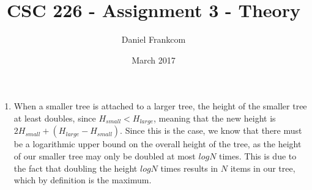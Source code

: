 \documentclass{article}
\title{CSC 226 - Assignment 3 - Theory}
\date{March 2017}
\author{Daniel Frankcom}
\begin{document}
	\maketitle
	\setlength{\parindent}{0pt}
	\newcommand{\forceindent}{\leavevmode{\parindent=72pt\indent}}
	\newpage
	
	\begin{enumerate}
		\item When a smaller tree is attached to a larger tree, the height of the smaller tree at least doubles, since $H_{small}<H_{large}$, meaning that the new height is $2H_{small}+(H_{large}-H_{small})$.
		\newline Since this is the case, we know that there must be a logarithmic upper bound on the overall height of the tree, as the height of our smaller tree may only be doubled at most $logN$ times. This is due to the fact that doubling the height $logN$ times results in $N$ items in our tree, which by definition is the maximum.
	\end{enumerate}
\end{document}

